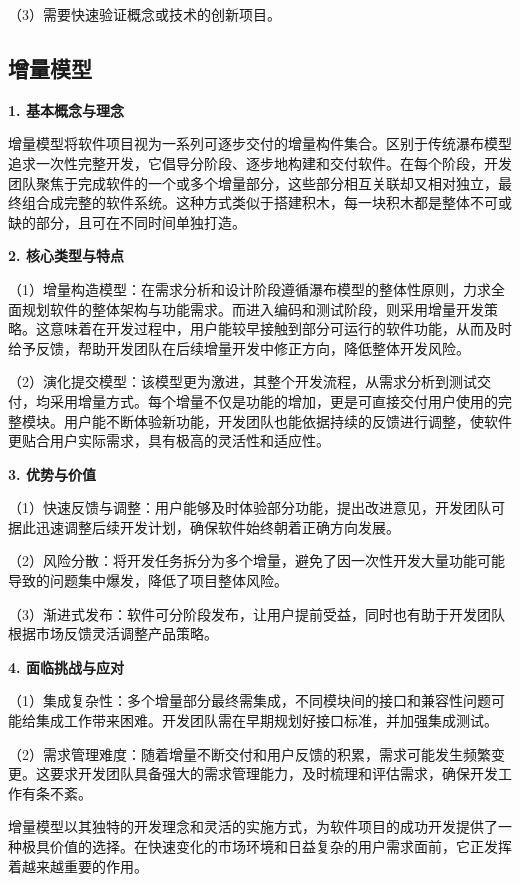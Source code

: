（3）需要快速验证概念或技术的创新项目。

\subsection{增量模型}

\textbf{1. 基本概念与理念}

增量模型将软件项目视为一系列可逐步交付的增量构件集合。区别于传统瀑布模型追求一次性完整开发，它倡导分阶段、逐步地构建和交付软件。在每个阶段，开发团队聚焦于完成软件的一个或多个增量部分，这些部分相互关联却又相对独立，最终组合成完整的软件系统。这种方式类似于搭建积木，每一块积木都是整体不可或缺的部分，且可在不同时间单独打造。

\textbf{2. 核心类型与特点}

（1）增量构造模型：在需求分析和设计阶段遵循瀑布模型的整体性原则，力求全面规划软件的整体架构与功能需求。而进入编码和测试阶段，则采用增量开发策略。这意味着在开发过程中，用户能较早接触到部分可运行的软件功能，从而及时给予反馈，帮助开发团队在后续增量开发中修正方向，降低整体开发风险。

（2）演化提交模型：该模型更为激进，其整个开发流程，从需求分析到测试交付，均采用增量方式。每个增量不仅是功能的增加，更是可直接交付用户使用的完整模块。用户能不断体验新功能，开发团队也能依据持续的反馈进行调整，使软件更贴合用户实际需求，具有极高的灵活性和适应性。

\textbf{3. 优势与价值}

（1）快速反馈与调整：用户能够及时体验部分功能，提出改进意见，开发团队可据此迅速调整后续开发计划，确保软件始终朝着正确方向发展。

（2）风险分散：将开发任务拆分为多个增量，避免了因一次性开发大量功能可能导致的问题集中爆发，降低了项目整体风险。

（3）渐进式发布：软件可分阶段发布，让用户提前受益，同时也有助于开发团队根据市场反馈灵活调整产品策略。

\textbf{4. 面临挑战与应对}

（1）集成复杂性：多个增量部分最终需集成，不同模块间的接口和兼容性问题可能给集成工作带来困难。开发团队需在早期规划好接口标准，并加强集成测试。

（2）需求管理难度：随着增量不断交付和用户反馈的积累，需求可能发生频繁变更。这要求开发团队具备强大的需求管理能力，及时梳理和评估需求，确保开发工作有条不紊。

增量模型以其独特的开发理念和灵活的实施方式，为软件项目的成功开发提供了一种极具价值的选择。在快速变化的市场环境和日益复杂的用户需求面前，它正发挥着越来越重要的作用。

